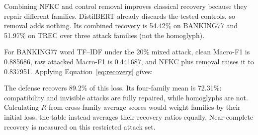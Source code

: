 \begin{table}[!tbp]
\centering\small
\caption{Mean defense recovery at 20\% strength, shown as \(100R\): 72.31 means 72.31\% of the lost score recovered on the equal-family average. Each classical row averages four defined family ratios. DistilBERT averages three, excluding invisible attacks because their raw score loss is zero. Rounded 100.00 values need not imply exact recovery.}

\label{tab:defense-recovery}
\end{table}

Combining NFKC and control removal improves classical recovery because they repair different families. DistilBERT already discards the tested controls, so removal adds nothing. Its combined recovery is 54.42\% on BANKING77 and 51.97\% on TREC over three attack families (not the homoglyph).

\label{sec:recovery-example}
For BANKING77 word TF--IDF under the 20\% mixed attack, clean Macro-F1 is 0.885686, raw attacked Macro-F1 is 0.441687, and NFKC plus removal raises it to 0.837951. Applying Equation~\ref{eq:recovery} gives:

The defense recovers 89.2\% of this loss. Its four-family mean is 72.31\%: compatibility and invisible attacks are fully repaired, while homoglyphs are not. Calculating \(R\) from cross-family average scores would weight families by their initial loss; the table instead averages their recovery ratios equally.
 Near-complete recovery is measured on this restricted attack set.
